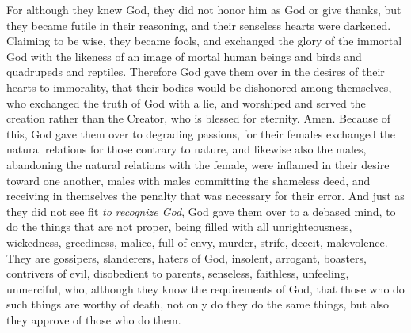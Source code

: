 \begin{biblechapter}
\verse For although they knew God, they did not honor him as God or give thanks, but they became futile in their reasoning, and their senseless hearts were darkened.
\verse Claiming to be wise, they became fools,
\verse and exchanged the glory of the immortal God with the likeness of an image of mortal human beings and birds and quadrupeds and reptiles.
\verse Therefore God gave them over in the desires of their hearts to immorality, that their bodies would be dishonored among themselves,
\verse who exchanged the truth of God with a lie, and worshiped and served the creation rather than the Creator, who is blessed for eternity. Amen.
 Because of this, God gave them over to degrading passions, for their females exchanged the natural relations for those contrary to nature,
\verse and likewise also the males, abandoning the natural relations with the female, were inflamed in their desire toward one another, males with males committing the shameless deed, and receiving in themselves the penalty that was necessary for their error.
\verse And just as they did not see fit \textit{to recognize God}, God gave them over to a debased mind, to do the things that are not proper,
\verse being filled with all unrighteousness, wickedness, greediness, malice, full of envy, murder, strife, deceit, malevolence. They are gossipers,
\verse slanderers, haters of God, insolent, arrogant, boasters, contrivers of evil, disobedient to parents,
\verse senseless, faithless, unfeeling, unmerciful,
\verse who, although they know the requirements of God, that those who do such things are worthy of death, not only do they do the same things, but also they approve of those who do them.
\end{biblechapter}

